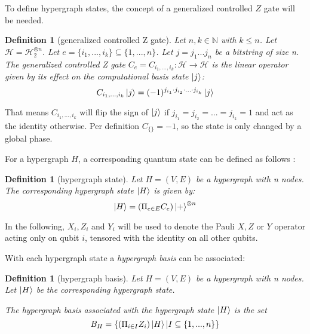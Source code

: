 \documentclass[12pt]{iopart}
\newtheorem{definition}[lemma]{Definition}
\begin{document}
To define hypergraph states, the concept of a generalized controlled $Z$ gate will be needed.

\begin{definition}[generalized controlled Z gate]
Let $n,k \in \mathbb{N}$ with $k \leq n$. Let $\mathscr{H} = \mathscr{H}_2^{\otimes n}$. Let $e = \{i_1, ... ,i_k\} \subseteq \{1,...,n\}$. Let $j = j_1...j_n$ be a bitstring of size n. The generalized controlled Z gate $C_e = C_{i_1, ... ,i_k}: \mathscr{H} \rightarrow \mathscr{H}$ is the linear operator given by its effect on the computational basis state $\ket{j}$:
\begin{equation}
C_{i_1, ... ,i_k}\ket{j} = (-1)^{j_{i_1} \cdot j_{i_2} \cdot ... \cdot j_{i_k}}  \ket{j}
\end{equation}
\end{definition} 

That means $C_{i_1, ... ,i_k}$ will flip the sign of $\ket{j}$ if $j_{i_1} = j_{i_2} = ... = j_{i_k} = 1$ and act as the identity otherwise. Per definition $C_{\{\}} = -1$, so the state is only changed by a global phase.

For a hypergraph $H$, a corresponding quantum state can be defined as follows \cite{BP2}:

\begin{definition}[hypergraph state]
Let $H = (V,E)$ be a hypergraph with n nodes. The corresponding hypergraph state $\ket{H}$ is given by:
\begin{equation}
\ket{H} = (\Pi_{e \in E} C_e)\ket{+}^{\otimes n}
\end{equation}
\end{definition}

In the following, $X_i,Z_i$ and $Y_i$ will be used to denote the Pauli $X,Z$ or $Y$ operator acting only on qubit $i$, tensored with the identity on all other qubits.

With each hypergraph state a \textit{hypergraph basis} can be associated:

\begin{definition}[hypergraph basis]
\label{hypergraph basis}
Let $H = (V,E)$ be a hypergraph with n nodes. Let $\ket{H}$ be the corresponding hypergraph state.

The hypergraph basis associated with the hypergraph state $\ket{H}$ is the set
\begin{equation}
B_H = \{(\Pi_{i \in I}Z_i) \ket{H}| I \subseteq \{1,...,n\}\}
\end{equation}
\end{definition}
\end{document}
